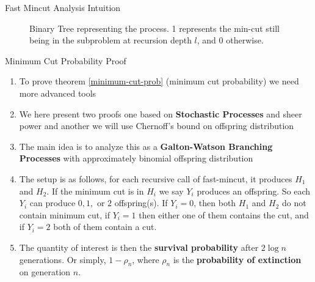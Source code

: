 \begin{frame}{Fast Mincut Analysis Intuition}
    \begin{figure}
        \centering
        \caption{Binary Tree representing the process. 1 represents the min-cut still being in the subproblem at recursion depth $l$, and $0$ otherwise.}
        \label{fig:branching-proc}
    \end{figure}
\end{frame}

\begin{frame}{Minimum Cut Probability Proof}
    \begin{enumerate}
        \item To prove theorem \ref{minimum-cut-prob} (minimum cut probability) we need more advanced tools
        \item We here present two proofs one based on \textbf{Stochastic Processes} and sheer power and another we will use Chernoff's bound on offspring distribution
        \item The main idea is to analyze this as a \textbf{Galton-Watson Branching Processes} with approximately binomial offspring distribution
        \item The setup is as follows, for each recursive call of fast-mincut, it produces $H_1$ and $H_2$. If the minimum cut is in $H_i$ we say $Y_i$ produces an offspring. So each $Y_i$ can produce $0, 1,$ or $2$ offspring(s). If $Y_i = 0$, then both $H_1$ and $H_2$ do not contain minimum cut, if $Y_i = 1$ then either one of them contains the cut, and if $Y_i = 2$ both of them contain a cut.
        \item The quantity of interest is then the \textbf{survival probability} after $2\log{n}$ generations. Or simply, $1 - \rho_n$, where $\rho_n$ is the \textbf{probability of extinction} on generation $n$.
    \end{enumerate}
\end{frame}

